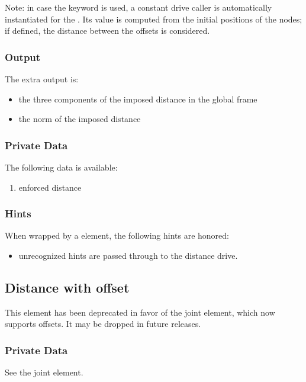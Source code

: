 Note: in case the keyword  is used, a constant drive
caller is automatically instantiated for the . 
Its value is computed from the initial positions of the nodes;
if defined, the distance between the offsets is considered. 

\subsubsection{Output}
The extra output is:
\begin{itemize}
    \item the three components of the imposed distance in the global frame
    \item the norm of the imposed distance
\end{itemize}

\subsubsection{Private Data}
The following data is available:
\begin{enumerate}
\item {} enforced distance
\end{enumerate}

\subsubsection{Hints}
When wrapped by a  element, the following hints are honored:
\begin{itemize}
\item unrecognized hints are passed through to the distance drive.
\end{itemize}



\subsection{Distance with offset}
This element has been deprecated in favor of the 
joint element, which now supports offsets.
It may be dropped in future releases.

\subsubsection{Private Data}
See the  joint element.



